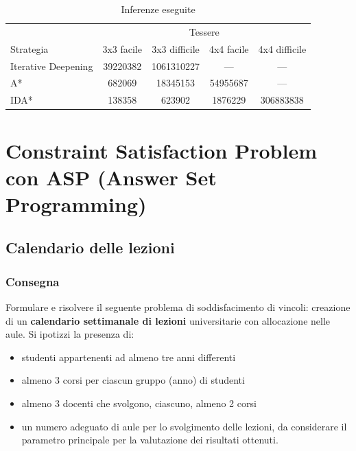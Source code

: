 \documentclass[a4paper,oneside,12pt]{book}
\begin{document}
	\begin{table}
		\centering
		\begin{tabular}{l c c c c}
			\toprule %
			& \multicolumn{4}{c}{Tessere} \\ %
			\cmidrule(l){2-5} %
			Strategia & 3x3 facile & 3x3 difficile & 4x4 facile & 4x4 difficile\\ %
			\midrule %
			Iterative Deepening
			& \num{39220382}& \num{1061310227} & --- & --- \\ %
			A*
			& \num{682069} & \num{18345153} & \num{54955687	} & --- \\ %
			IDA*
			& \num{138358} & \num{623902} & \num{1876229} & \num{306883838}\\ %
			\bottomrule
		\end{tabular}
		\caption{Inferenze eseguite}
	\end{table}
	\FloatBarrier
	\restoregeometry
	\section*{Constraint Satisfaction Problem con ASP (Answer Set Programming)}
	\subsection*{Calendario delle lezioni}
	\subsubsection{Consegna}
	Formulare e risolvere il seguente problema di soddisfacimento
	di vincoli:
	creazione di un \textbf{calendario settimanale di lezioni} universitarie con
	allocazione nelle aule. Si ipotizzi la presenza di:
	\begin{itemize}
		\item studenti appartenenti ad almeno tre anni differenti
		\item almeno 3 corsi per ciascun gruppo (anno) di studenti
		\item almeno 3 docenti che svolgono, ciascuno, almeno 2
		corsi
		\item un numero adeguato di aule per lo svolgimento delle
		lezioni, da considerare il parametro principale per la
		valutazione dei risultati ottenuti.
	\end{itemize}
\end{document}
